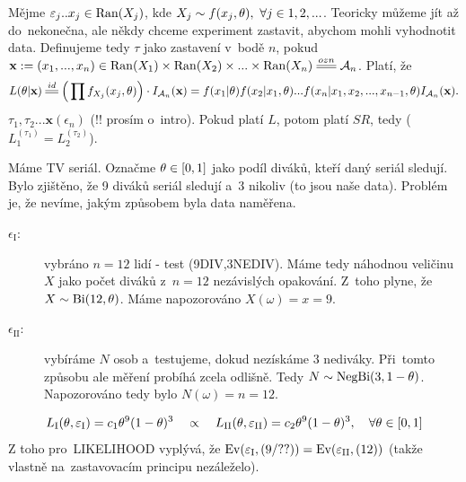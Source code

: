 \begin{example}
	Mějme $\varepsilon_j..x_j\in\mathop{\mathrm{Ran}}(X_j)$, kde $X_j\sim f(x_j,\theta),~\forall j\in 1,2,...$. Teoricky můžeme jít až do~nekonečna, ale někdy chceme experiment zastavit, abychom mohli vyhodnotit data. Definujeme tedy $\tau$ jako zastavení v~bodě $n$, pokud $\textbf{x}:=(x_1,...,x_n)\in\Ran(X_1)\times\Ran(X_2)\times...\times\Ran(X_n)\equal{ozn}\Aa_n$. Platí, že
	$$ L(\t|\textbf{x})\equal{id}\Big(\prod f_{X_j}(x_j,\t) \Big)\cdot I_{\Aa_n}(\textbf{x})=f(x_1|\t)f(x_2|x_1,\t)...f(x_n|x_1,x_2,...,x_{n-1},\t)I_{\Aa_n}(\textbf{x}).$$
	$\tau_1,\tau_2... \textbf{x}(\epsilon_n)$ (!! prosím o~intro). Pokud platí $L$, potom platí $SR$, tedy ($L_1^{(\tau_1)}=L_2^{(\tau_2)}$).
\end{example}
\begin{example}
	Máme TV seriál. Označme $\theta\in[0,1]$ jako podíl diváků, kteří daný seriál sledují. Bylo zjištěno, že 9 diváků seriál sledují a~3 nikoliv (to jsou naše data). Problém je, že nevíme, jakým způsobem byla data naměřena. 
	\begin{description}
		\item[$\epsilon_\mathrm{I}:$] vybráno $n=12$ lidí - test (9DIV,3NEDIV). Máme tedy náhodnou veličinu $X$ jako počet diváků z~$n=12$ nezávislých opakování. Z~toho plyne, že $X\sim \mathrm{Bi}(12,\theta)$. Máme napozorováno $X(\omega)=x=9$.
		\item[$\epsilon_\mathrm{II}:$] vybíráme $N$ osob a~testujeme, dokud nezískáme $3$ nediváky. Při~tomto způsobu ale měření probíhá zcela odlišně. Tedy $N\sim\mathrm{NegBi}(3,1-\theta)$. Napozorováno tedy bylo $N(\omega)=n=12$.
	\end{description}
$$ L_\mathrm{I}(\theta,\varepsilon_\mathrm{I})=c_1\theta^9(1-\theta)^3\quad\propto\quad L_\mathrm{II}(\theta,\varepsilon_\mathrm{II})=c_2\theta^9(1-\theta)^3,\quad \forall\theta\in[0,1] $$
Z toho pro~LIKELIHOOD vyplývá, že $\mathrm{Ev}(\varepsilon_\mathrm{I},(9/??))=\mathrm{Ev}(\varepsilon_\mathrm{II},(12))$ (takže vlastně na~zastavovacím principu nezáleželo).
\end{example}


